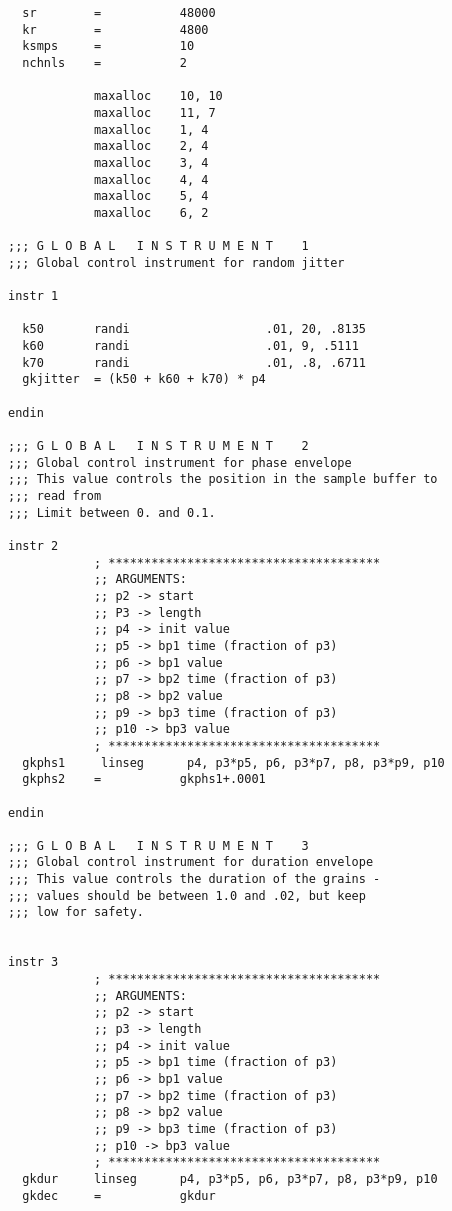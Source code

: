 \small
\begin{verbatim}
  sr        =           48000
  kr        =           4800
  ksmps     =           10
  nchnls    =           2

            maxalloc    10, 10
            maxalloc    11, 7
            maxalloc    1, 4
            maxalloc    2, 4
            maxalloc    3, 4
            maxalloc    4, 4
            maxalloc    5, 4
            maxalloc    6, 2

;;; G L O B A L   I N S T R U M E N T    1
;;; Global control instrument for random jitter

instr 1

  k50       randi                   .01, 20, .8135 
  k60       randi                   .01, 9, .5111
  k70       randi                   .01, .8, .6711
  gkjitter  = (k50 + k60 + k70) * p4

endin 

;;; G L O B A L   I N S T R U M E N T    2
;;; Global control instrument for phase envelope
;;; This value controls the position in the sample buffer to 
;;; read from
;;; Limit between 0. and 0.1.

instr 2
            ; **************************************
            ;; ARGUMENTS:
            ;; p2 -> start
            ;; P3 -> length
            ;; p4 -> init value
            ;; p5 -> bp1 time (fraction of p3)
            ;; p6 -> bp1 value
            ;; p7 -> bp2 time (fraction of p3)
            ;; p8 -> bp2 value
            ;; p9 -> bp3 time (fraction of p3)
            ;; p10 -> bp3 value
            ; **************************************
  gkphs1     linseg      p4, p3*p5, p6, p3*p7, p8, p3*p9, p10
  gkphs2    =           gkphs1+.0001

endin 

;;; G L O B A L   I N S T R U M E N T    3
;;; Global control instrument for duration envelope
;;; This value controls the duration of the grains -
;;; values should be between 1.0 and .02, but keep 
;;; low for safety.


instr 3
            ; **************************************
            ;; ARGUMENTS:
            ;; p2 -> start
            ;; p3 -> length
            ;; p4 -> init value
            ;; p5 -> bp1 time (fraction of p3)
            ;; p6 -> bp1 value
            ;; p7 -> bp2 time (fraction of p3)
            ;; p8 -> bp2 value
            ;; p9 -> bp3 time (fraction of p3)
            ;; p10 -> bp3 value
            ; **************************************
  gkdur     linseg      p4, p3*p5, p6, p3*p7, p8, p3*p9, p10
  gkdec     =           gkdur


\end{verbatim}
